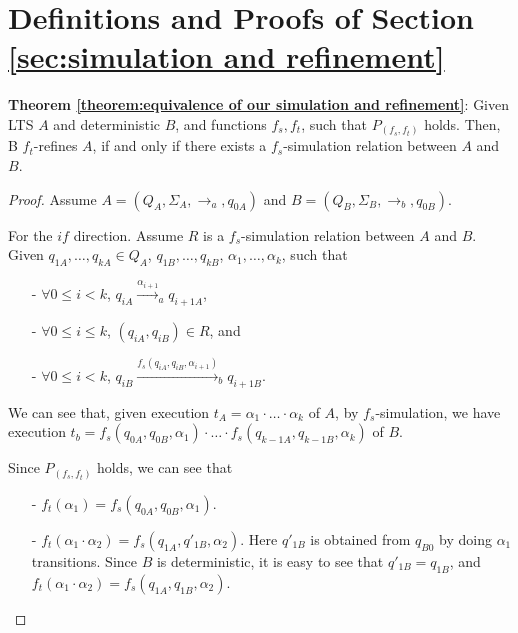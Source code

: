\section{Definitions and Proofs of Section \ref{sec:simulation and refinement}}
\label{sec:appendix definitions and proofs of section simulation and refinement}


{\noindent \bf Theorem \ref{theorem:equivalence of our simulation and refinement}}: Given LTS $A$ and deterministic $B$, and functions $f_s,f_t$, such that $P_{(f_s,f_t)}$ holds. Then, B $f_t$-refines $A$, if and only if there exists a $f_s$-simulation relation between $A$ and $B$.

\begin {proof}
Assume $A = (Q_A,\Sigma_A,\rightarrow_a,q_{0A})$ and $B = (Q_B,\Sigma_B,\rightarrow_b,q_{0B})$.

For the $\mathit{if}$ direction. Assume $R$ is a $f_s$-simulation relation between $A$ and $B$. Given $q_{1A},\ldots,q_{kA} \in Q_A$, $q_{1B},\ldots,q_{kB}$, $\alpha_1,\ldots,\alpha_k$, such that

\begin{itemize}
\setlength{\itemsep}{0.5pt}
\item[-] $\forall 0 \leq i < k$, $q_{iA} {\xrightarrow{\alpha_{i+1}}}_a q_{i+1A}$,

\item[-] $\forall 0 \leq i \leq k$, $(q_{iA},q_{iB}) \in R$, and

\item[-] $\forall 0 \leq i < k$, $q_{iB} {\xrightarrow{f_s(q_{iA},q_{iB},\alpha_{i+1})}}_b q_{i+1B}$.
\end{itemize}

We can see that, given execution $t_A = \alpha_1 \cdot \ldots \cdot \alpha_k$ of $A$, by $f_s$-simulation, we have execution $t_b = f_s(q_{0A},q_{0B},\alpha_1) \cdot \ldots \cdot f_s(q_{k-1A},q_{k-1B},\alpha_k)$ of $B$.

Since $P_{(f_s,f_t)}$ holds, we can see that

\begin{itemize}
\setlength{\itemsep}{0.5pt}
\item[-] $f_t(\alpha_1) = f_s(q_{0A},q_{0B},\alpha_1)$.

\item[-] $f_t(\alpha_1 \cdot \alpha_2) = f_s(q_{1A},q'_{1B},\alpha_2)$. Here $q'_{1B}$ is obtained from $q_{B0}$ by doing $\alpha_1$ transitions. Since $B$ is deterministic, it is easy to see that $q'_{1B} = q_{1B}$, and $f_t(\alpha_1 \cdot \alpha_2) = f_s(q_{1A},q_{1B},\alpha_2)$.


\end{itemize}
\end{proof}
